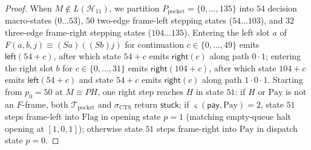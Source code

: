 \documentclass[11pt,reqno]{amsart}
\numberwithin{equation}{section}
\theoremstyle{plain}
\theoremstyle{definition}
\theoremstyle{remark}
\begin{document}
\begin{proof}
When $M \notin L(\mathcal{H}_{11})$, we partition $P_{\mathrm{pocket}} = \{0,\dots,135\}$ into $54$ decision macro-states ($0 \dots 53$), $50$ two-edge frame-left stepping states ($54 \dots 103$), and $32$ three-edge frame-right stepping states ($104 \dots 135$). Entering the left slot $a$ of $F(a,b,j) \equiv (S a)((S b) j)$ for continuation $c \in \{0,\dots,49\}$ emits $\mathsf{left}(54 + c)$, after which state $54 + c$ emits $\mathsf{right}(c)$ along path $0 \cdot 1$; entering the right slot $b$ for $c \in \{0,\dots,31\}$ emits $\mathsf{right}(104 + c)$, after which state $104 + c$ emits $\mathsf{left}(54 + c)$ and state $54 + c$ emits $\mathsf{right}(c)$ along path $1 \cdot 0 \cdot 1$. Starting from $p_0 = 50$ at $M \equiv P H$, one right step reaches $H$ in state $51$: if $H$ or $\mathrm{Pay}$ is not an $F$-frame, both $\mathcal{T}_{\mathrm{pocket}}$ and $\sigma_{\mathrm{CTS}}$ return $\mathsf{stuck}$; if $\varsigma(\mathsf{pay}, \mathrm{Pay}) = 2$, state $51$ steps frame-left into $\mathrm{Flag}$ in opening state $p = 1$ (matching empty-queue halt opening at $[1,0,1]$); otherwise state $51$ steps frame-right into $\mathrm{Pay}$ in dispatch state $p = 0$.


\end{proof}
\end{document}
